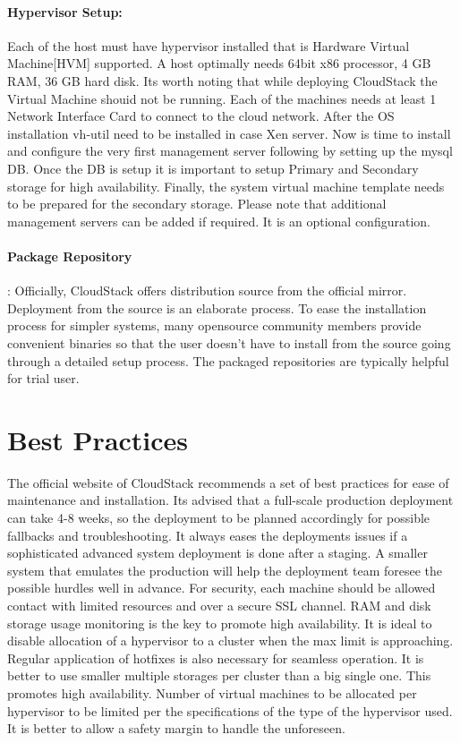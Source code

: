 \paragraph {Hypervisor Setup:} Each of the host must have hypervisor installed that is Hardware
Virtual Machine[HVM] supported. A host optimally needs 64bit x86 processor, 4 GB
RAM, 36 GB hard disk. Its worth noting that while deploying CloudStack the Virtual 
Machine shouid not be running. Each of the machines needs at least 1 Network Interface Card 
to connect to the cloud network.  After the OS installation vh-util need to be installed 
in case Xen server. Now is time to install and configure the very first management 
server following by setting up the mysql DB. Once the DB is setup it is important to 
setup Primary and Secondary storage for high availability. Finally, the system virtual 
machine template needs to be prepared for the secondary storage. Please note
 that additional management servers can be added if required. It is an optional configuration.

\paragraph {Package Repository}: Officially, CloudStack offers distribution source from the 
official mirror. Deployment from the source is an elaborate process. To ease the installation 
process for simpler systems, many opensource community members provide convenient binaries
so that the user doesn’t have to install from the source going through a detailed setup 
process. The packaged repositories are typically helpful for trial user. ~\cite{hid-sp18-417-www-cloudstack-package-repo}


\section{Best Practices}

The official website of CloudStack recommends a set of best practices for ease of 
maintenance and installation. Its advised that a full-scale production deployment 
can take 4-8 weeks, so the deployment to be planned accordingly for possible 
fallbacks and troubleshooting. It always eases the deployments issues if a sophisticated 
advanced system deployment is done after a staging. A smaller system that emulates the production 
 will help the deployment team foresee the possible hurdles well in advance. 
For security, each machine should be allowed contact 
with limited resources and over a secure SSL channel. RAM and disk storage usage monitoring 
is the key to promote high availability. It is ideal to disable allocation of a hypervisor
to a cluster when the max limit is approaching. Regular application of hotfixes is also necessary for 
seamless operation. It is better to use smaller multiple storages per cluster than a big single one.
This promotes high availability. Number of virtual machines to be allocated per hypervisor to be limited per the
specifications of the type of the hypervisor used. It is better to allow a safety margin to handle the unforeseen.
 ~\cite{hid-sp18-417-www-cloudstack-best-practices}



